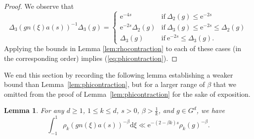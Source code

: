 \documentclass[12pt]{amsart}
\newtheorem{lem}[thm]{Lemma}
\theoremstyle{definition}
\theoremstyle{remark}
\numberwithin{equation}{section}
\newcommand{\dd}{\mathrm{d}}
\newcommand{\e}{\mathrm{e}}
\begin{document}
\begin{proof}
  We observe that 
  \begin{equation}
    \label{eq:kappaas}
    \Delta_3(gn(\xi)a(s))^{-1} \Delta_3(g) =
    \begin{cases}
      \e^{-4s}  & \mathrm{if\ } \Delta_2(g) \leq \e^{-2s} \\
      \e^{-2s} \Delta_2(g)  & \mathrm{if\ }  \Delta_3(g) \leq \e^{-2s} \leq \Delta_2(g) \\
      \Delta_3(g) & \mathrm{if\ } \e^{-2s} \leq \Delta_3(g).
    \end{cases}
  \end{equation}
  Applying the bounds in Lemma \ref{lem:rhocontraction} to each of these cases (in the corresponding order) implies (\ref{eq:phicontraction}). 
\end{proof}

We end this section by recording the following lemma establishing a weaker bound than Lemma~\ref{lem:phicontraction}, but for a larger range of $\beta$ that we omitted from the proof of Lemma~\ref{lem:phicontraction} for the sake of exposition.
\begin{lem}
  \label{lem:cruderhocontraction}
  For any $d\geq 1$, $1\leq k\leq d$, $s > 0$, $\beta > \tfrac{1}{k}$, and $g \in G^d$, we have
  \begin{equation}
    \label{eq:crudeloccontraction}
    \int_{-1}^1 \rho_k (g n(\xi) a(s))^{-\beta} \dd \xi \ll \e^{-(2-\beta k )s} \rho_k(g)^{-\beta}.
  \end{equation}
\end{lem}
\end{document}
